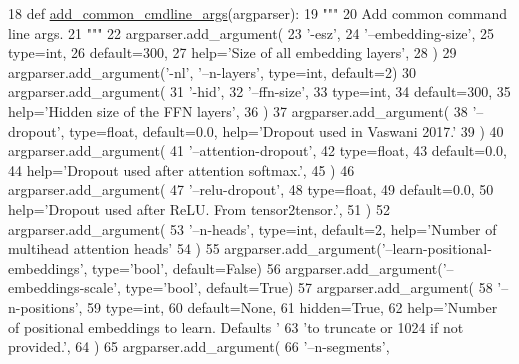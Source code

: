 \begin{DoxyCode}
18 \textcolor{keyword}{def }\hyperlink{namespaceparlai_1_1agents_1_1transformer_1_1transformer_a916bc49d43dc0e244d24c47956c621ca}{add\_common\_cmdline\_args}(argparser):
19     \textcolor{stringliteral}{"""}
20 \textcolor{stringliteral}{    Add common command line args.}
21 \textcolor{stringliteral}{    """}
22     argparser.add\_argument(
23         \textcolor{stringliteral}{'-esz'},
24         \textcolor{stringliteral}{'--embedding-size'},
25         type=int,
26         default=300,
27         help=\textcolor{stringliteral}{'Size of all embedding layers'},
28     )
29     argparser.add\_argument(\textcolor{stringliteral}{'-nl'}, \textcolor{stringliteral}{'--n-layers'}, type=int, default=2)
30     argparser.add\_argument(
31         \textcolor{stringliteral}{'-hid'},
32         \textcolor{stringliteral}{'--ffn-size'},
33         type=int,
34         default=300,
35         help=\textcolor{stringliteral}{'Hidden size of the FFN layers'},
36     )
37     argparser.add\_argument(
38         \textcolor{stringliteral}{'--dropout'}, type=float, default=0.0, help=\textcolor{stringliteral}{'Dropout used in Vaswani 2017.'}
39     )
40     argparser.add\_argument(
41         \textcolor{stringliteral}{'--attention-dropout'},
42         type=float,
43         default=0.0,
44         help=\textcolor{stringliteral}{'Dropout used after attention softmax.'},
45     )
46     argparser.add\_argument(
47         \textcolor{stringliteral}{'--relu-dropout'},
48         type=float,
49         default=0.0,
50         help=\textcolor{stringliteral}{'Dropout used after ReLU. From tensor2tensor.'},
51     )
52     argparser.add\_argument(
53         \textcolor{stringliteral}{'--n-heads'}, type=int, default=2, help=\textcolor{stringliteral}{'Number of multihead attention heads'}
54     )
55     argparser.add\_argument(\textcolor{stringliteral}{'--learn-positional-embeddings'}, type=\textcolor{stringliteral}{'bool'}, default=\textcolor{keyword}{False})
56     argparser.add\_argument(\textcolor{stringliteral}{'--embeddings-scale'}, type=\textcolor{stringliteral}{'bool'}, default=\textcolor{keyword}{True})
57     argparser.add\_argument(
58         \textcolor{stringliteral}{'--n-positions'},
59         type=int,
60         default=\textcolor{keywordtype}{None},
61         hidden=\textcolor{keyword}{True},
62         help=\textcolor{stringliteral}{'Number of positional embeddings to learn. Defaults '}
63         \textcolor{stringliteral}{'to truncate or 1024 if not provided.'},
64     )
65     argparser.add\_argument(
66         \textcolor{stringliteral}{'--n-segments'},

\end{DoxyCode}
